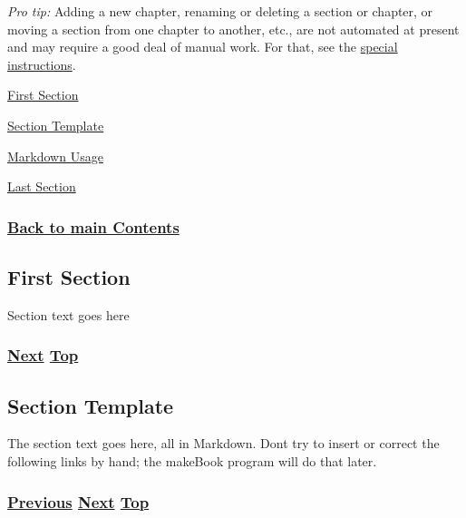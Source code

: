\documentclass[
]{article}
\begin{document}
\emph{Pro tip:} Adding a new chapter, renaming or deleting a section or
chapter, or moving a section from one chapter to another, etc., are not
automated at present and may require a good deal of manual work. For
that, see the
\href{https://github.com/becarpenter/book6/blob/main/utilities/chapterReorg.md}{special
instructions}.

\hyperref[first-section]{First Section}

\hyperref[section-template]{Section Template}

\hyperref[markdown-usage]{Markdown Usage}

\hyperref[last-section]{Last Section}

\subsubsection{\texorpdfstring{\hyperref[list-of-contents]{Back to main
Contents}}{Back to main Contents}}\label{back-to-main-contents-11}

\pagebreak

\subsection{First Section}\label{first-section}

Section text goes here

\subsubsection{\texorpdfstring{\hyperref[section-template]{Next}
\hyperref[chapter-template]{Top}}{Next Top}}\label{next-top-10}

\pagebreak

\subsection{Section Template}\label{section-template}

The section text goes here, all in Markdown. Don\textquotesingle t try
to insert or correct the following links by hand; the makeBook program
will do that later.

\subsubsection{\texorpdfstring{\hyperref[first-section]{Previous}
\hyperref[markdown-usage]{Next}
\hyperref[chapter-template]{Top}}{Previous Next Top}}\label{previous-next-top-39}
\end{document}
